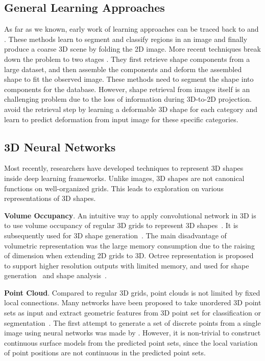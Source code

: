 \subsection{General Learning Approaches}
As far as we known, early work of learning approaches can be traced back to \cite{Hoiem2007} and \cite{learn3D2007}. These methods learn to segment and classify regions in an image and finally produce a coarse 3D scene by folding the 2D image.
%
More recent techniques break down the problem to two stages \cite{Su:2014,jointimgshape}. They first retrieve shape components from a large dataset, and then assemble the components and deform the assembled shape to fit the observed image. These methods need to segment the shape into components for the database.
%
However, shape retrieval from images itself is an challenging problem due to the loss of information during 3D-to-2D projection. 
\cite{imgrecon15} avoid the retrieval step by learning a deformable 3D shape for each category and learn to predict deformation from input image for these specific categories.
%
\subsection{3D Neural Networks}
Most recently, researchers have developed techniques to represent 3D shapes inside deep learning frameworks. Unlike images, 3D shapes are not canonical functions on well-organized grids.
This leads to exploration on various representations of 3D shapes.

\noindent\textbf{Volume Occupancy}. 
An intuitive way to apply convolutional network in 3D is to use volume occupancy of regular 3D grids to represent 3D shapes~\cite{3dshapenet}. It is subsequently used for 3D shape generation~\cite{3DR2N2,learnobj}.
%
The main disadvantage of volumetric representation was the large memory consumption due to the raising of dimension when extending 2D grids to 3D. 
Octree representation is proposed to support higher resolution outputs with limited memory, and used for shape generation~\cite{octreegen} and shape analysis~\cite{ocnn}.

\noindent\textbf{Point Cloud}. 
Compared to regular 3D grids, point clouds is not limited by fixed local connections.
Many networks have been proposed to take unordered 3D point sets as input and extract geometric features from 3D point set for classification or segmentation~\cite{pointnet,NIPS2017_7095,pointcnn}.
%
The first attempt to generate a set of discrete points from a single image using neural networks was made by \cite{PSGN}. However, it is non-trivial to construct continuous surface models from the predicted point sets, since the local variation of point positions are not continuous in the predicted point sets.

